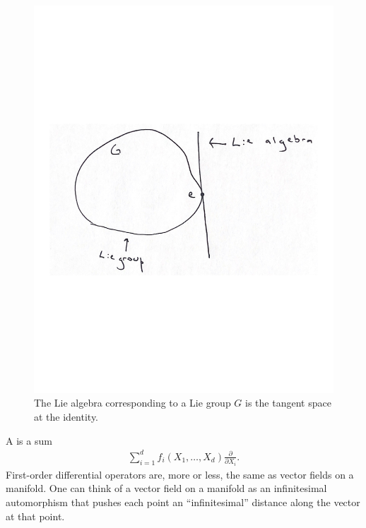\documentclass [11 pt, twoside] {article}
\begin{document}
\begin{figure}
	\begin{center}
		\includegraphics[scale=0.5]{images/tangentspace}
		\caption{The Lie algebra corresponding to a Lie group $G$ is the tangent space at the identity.}
	\end{center}
\end{figure}

A   is a sum
\begin{align*}
	\sum_{i=1}^{d} f_{i}(X_1,\hdots,X_{d}) \frac{\partial}{\partial X_{i}}.
\end{align*}
First-order differential operators are, more or less, the same as vector fields on a manifold.
One can think of a vector field on a manifold as an infinitesimal automorphism that pushes each point an ``infinitesimal'' distance along the vector at that point.
\end{document}
